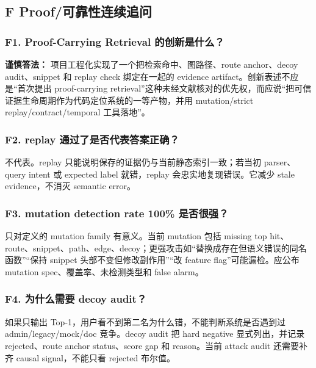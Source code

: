 \documentclass[UTF8,12pt,openany]{ctexbook}
\begin{document}
\subsection{F Proof/可靠性连续追问}

\subsubsection{F1. Proof-Carrying Retrieval 的创新是什么？}

\textbf{谨慎答法：} 项目工程化实现了一个把检索命中、图路径、route anchor、decoy audit、snippet 和 replay check 绑定在一起的 evidence artifact。创新表述不应是“首次提出 proof-carrying retrieval”这种未经文献核对的优先权，而应说“把可信证据生命周期作为代码定位系统的一等产物，并用 mutation/strict replay/contract/temporal 工具落地”。\par

\subsubsection{F2. replay 通过了是否代表答案正确？}

不代表。replay 只能说明保存的证据仍与当前静态索引一致；若当初 parser、query intent 或 expected label 就错，replay 会忠实地复现错误。它减少 stale evidence，不消灭 semantic error。\par

\subsubsection{F3. mutation detection rate 100\% 是否很强？}

只对定义的 mutation family 有意义。当前 mutation 包括 missing top hit、route、snippet、path、edge、decoy；更强攻击如“替换成存在但语义错误的同名函数”“保持 snippet 头部不变但修改副作用”“改 feature flag”可能漏检。应公布 mutation spec、覆盖率、未检测类型和 false alarm。\par

\subsubsection{F4. 为什么需要 decoy audit？}

如果只输出 Top-1，用户看不到第二名为什么错，不能判断系统是否遇到过 admin/legacy/mock/doc 竞争。decoy audit 把 hard negative 显式列出，并记录 rejected、route anchor status、score gap 和 reason。当前 attack audit 还需要补齐 causal signal，不能只看 rejected 布尔值。\par
\end{document}
